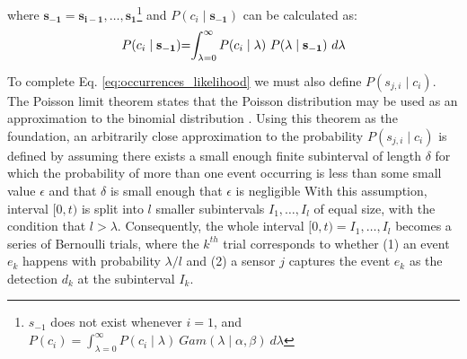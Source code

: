 \noindent where $\mathbf{s_{-1}} = \mathbf{s_{i-1}}, \ldots, \mathbf{s_1}$\footnote{$s_{-1}$ does not exist whenever $i = 1$, and \\ $P(c_i) = \int_{\lambda=0}^{\infty} P(c_i \mid \lambda) ~ Gam(\lambda \mid \alpha, \beta) ~d\lambda$} and \hspace{0.3cm}$P(c_i \mid \mathbf{s_{-1}})$ can be calculated as:
\begin{equation}
	\label{eq:unconditional_xi}
	\begin{tabular}{r@{=}l}
		$P(c_i \mid \mathbf{s_{-1}})$ & $\displaystyle\int_{\lambda=0}^{\infty} P(c_i \mid \lambda) ~ P(\lambda \mid \mathbf{s_{-1}}) ~d\lambda$ \\ [2ex]
	\end{tabular}
\end{equation}
To complete Eq. \ref{eq:occurrences_likelihood} we must also define $P(s_{j,i} \mid c_i)$. The Poisson limit theorem states that the Poisson distribution may be used as an approximation to the binomial distribution \cite{papoulis2002probability}. Using this theorem as the foundation, an arbitrarily close approximation to the probability $P(s_{j,i} \mid c_i)$ is defined by assuming there exists a small enough finite subinterval of length $\delta$ for which the probability of more than one event occurring is less than some small value $ \epsilon$ and that $\delta$ is small enough that $\epsilon$ is negligible With this assumption, interval $[0, t)$ is split into $l$ smaller subintervals $I_1, \ldots, I_l$ of equal size, with the condition that $l > \lambda$. Consequently, the whole interval $[0, t) = I_1, \ldots, I_l$ becomes a series of Bernoulli trials, where the $k^{th}$ trial corresponds to whether (1) an event $e_k$ happens with probability $\lambda / l$ and (2) a sensor $j$ captures the event $e_k$ as the detection $d_k$ at the subinterval $I_k$.

